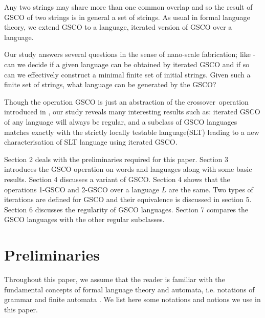 \documentclass{llncs}
\newcommand{\sa}{crossover~}
\begin{document}
\par Any two strings may share more than one common overlap and so the result of GSCO
 of two strings is in general a set of strings. As usual in formal language theory,
  we extend GSCO to a language, iterated version of GSCO over a language.

\par Our study answers several questions in the sense of nano-scale fabrication;
like - can we decide if a given language can be obtained by iterated
GSCO and if so
 can we effectively construct a minimal finite set of initial strings. Given such
 a finite set of strings, what language can be generated by the
 GSCO?

\par Though the operation GSCO is just an abstraction of the  \sa operation introduced
 in \cite{mitrana1}, our study reveals many interesting results such as: iterated GSCO
  of any
 language will always be regular, and a subclass of GSCO languages matches exactly with
 the strictly locally testable
 language(SLT) \cite{Mc} leading to a new characterisation of SLT language using
 iterated GSCO.

\par Section 2 deals with the preliminaries required for this paper.
Section 3 introduces the GSCO operation on words and languages along
with some basic results. Section 4 discusses a variant of GSCO.
Section 4 shows that the operations 1-GSCO and 2-GSCO over a
language $L$ are the same. Two types of iterations are defined for
GSCO and their equivalence is discussed in section 5. Section 6
discusses the regularity of GSCO languages. Section 7 compares the
GSCO languages with the other regular subclasses.
\section{Preliminaries}
\par Throughout this paper, we assume that the reader is familiar with
the fundamental concepts of formal language theory and automata, i.e.
 notations of grammar and finite automata \cite{HMU}.
We list here some notations and notions we use in this paper.
\end{document}
